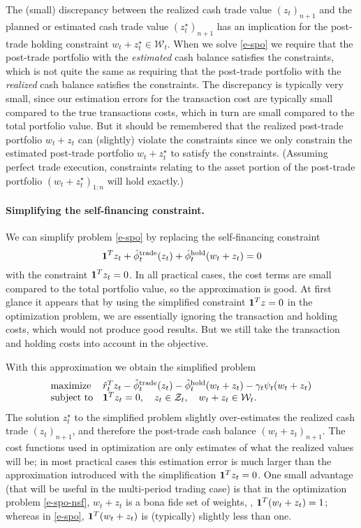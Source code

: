 \documentclass[openany]{article}  %
\newcommand{\trcosthat}{\hat \phi^\mathrm{trade}}
\newcommand{\hldcosthat}{\hat \phi^\mathrm{hold}}
\begin{document}
The (small) discrepancy between the realized cash trade value $(z_t)_{n+1}$ and
the planned or estimated cash trade value $(z_t^\star)_{n+1}$
has an implication for the post-trade holding
constraint $w_t+z_t^\star \in \mathcal W_t$.  When we solve \eqref{e-spo}
we require that the post-trade portfolio with the \emph{estimated}
cash balance satisfies
the constraints, which is not quite the same as requiring that
the post-trade portfolio with the \emph{realized} cash balance satisfies
the constraints.  The discrepancy is typically very small, since our estimation
errors for the transaction cost are typically small compared to the
true transactions costs, which in turn are small compared to
the total portfolio value.
But it should be remembered that the realized post-trade portfolio
$w_t + z_t$ can (slightly) violate the constraints since we only constrain
the estimated post-trade portfolio $w_t + z_t^\star$ to satisfy the constraints.
(Assuming perfect trade execution, constraints relating to the
asset portion of the post-trade portfolio
$(w_t+z_t^\star)_{1:n}$ will hold exactly.)

\paragraph{Simplifying the self-financing constraint.}
We can simplify problem \eqref{e-spo} by replacing the self-financing constraint
\[
\ones^Tz_t + \trcosthat_t (z_t) + \hldcosthat_t (w_t + z_t) = 0
\]
with the constraint $\mathbf 1^Tz_t = 0$.
In all practical cases, the cost terms are small compared to the total portfolio
value, so the approximation is good.
At first glance it appears that by using the simplified constraint $\mathbf 1^Tz=0$
in the optimization problem, we are essentially ignoring the transaction
and holding costs, which
would not produce good results.
But we still take the transaction and holding costs into account in the objective.

With this approximation we obtain the simplified problem
\begin{equation}\label{e-spo-nsf}
\begin{array}{ll}
\mbox{maximize} &
\hat r_t^T z_t
- \trcosthat_t (z_t) - \hldcosthat_t (w_t + z_t)
-\gamma_t \psi_t(w_t+z_t)\\
\mbox{subject to} &
\ones^Tz_t = 0, \quad z_t \in \mathcal Z_t, \quad
w_t + z_t \in \mathcal W_t.
\end{array}
\end{equation}
The solution $z_t^\star$ to the simplified problem
slightly over-estimates the realized cash trade $(z_t)_{n+1}$,
and therefore the post-trade cash balance $(w_t+z_t)_{n+1}$.
The cost functions used
in optimization are only estimates of what the realized values will be;
in most practical cases this estimation error is much larger than
the approximation introduced with the simplification $\mathbf 1^Tz_t=0$.
One small advantage (that will be useful in the multi-period trading case)
is that in the optimization problem \eqref{e-spo-nsf}, $w_t+z_t$ is a bona fide
set of weights, \ie, $\mathbf 1^T(w_t+z_t)=1$;
whereas in \eqref{e-spo},
$\mathbf 1^T(w_t+z_t)$ is (typically) slightly less than one.
\end{document}
